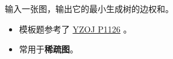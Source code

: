 \noindent 输入一张图，输出它的最小生成树的边权和。

\begin{itemize}
    \item 模板题参考了 \href{https://oiproxy.bugminer.top/OnlineJudge/problem_show.php?id=1126}{YZOJ P1126} 。
    \item 常用于\textbf{稀疏图}。
\end{itemize}